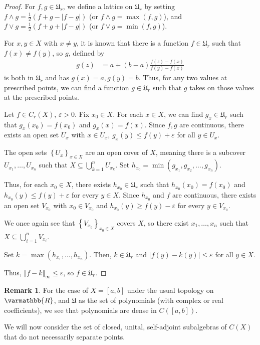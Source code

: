 \documentclass[10pt]{extarticle}
\newcommand{\R}{\mathbb{R}}
\newcommand{\norm}[1]{\left\Vert #1\right\Vert}
\newcommand{\set}[1]{\left\{#1\right\}}
\newcommand{\ve}{\varepsilon}
\theoremstyle{plain}
\theoremstyle{definition}
\theoremstyle{note}
\newtheorem*{remark}{Remark}
\renewcommand*{\mathbb}[1]{\varmathbb{#1}}
\renewcommand{\newline}{\hfill\break}
\begin{document}
\begin{proof}
  For $f,g\in \mathfrak{U}_r$, we define a lattice on $\mathfrak{U}_r$ by setting $f\wedge g = \frac{1}{2}\left(f + g - |f-g|\right)$ (or $f\wedge g = \max(f,g)$), and $f\vee g = \frac{1}{2}\left(f + g + |f-g|\right)$ (or $f\vee g = \min(f,g)$).\newline

  For $x,y\in X$ with $x\neq y$, it is known that there is a function $f\in \mathfrak{U}_r$ such that $f(x)\neq f(y)$, so $g$, defined by
  \begin{align*}
    g(z) &= a + \left(b-a\right)\frac{f(z)-f(x)}{f(y)-f(x)}
  \end{align*}
  is both in $\mathfrak{U}_r$ and has $g(x) = a,g(y) = b$. Thus, for any two values at prescribed points, we can find a function $g\in \mathfrak{U}_r$ such that $g$ takes on those values at the prescribed points.\newline

  Let $f\in C_{r}(X)$, $\ve > 0$. Fix $x_0\in X$. For each $x\in X$, we can find $g_x\in \mathfrak{U}_r$ such that $g_x\left(x_0\right) = f(x_0)$ and $g_x(x) = f(x)$. Since $f,g$ are continuous, there exists an open set $U_x$ with $x\in U_x$, $g_x(y)\leq f(y) + \ve$ for all $y\in U_{x}$.\newline

  The open sets $\set{U_x}_{x\in X}$ are an open cover of $X$, meaning there is a subcover $U_{x_1},\dots,U_{x_n}$ such that $X\subseteq \bigcup_{k=1}^{n}U_{x_k}$. Set $h_{x_0} = \min\left(g_{x_1},g_{x_2},\dots,g_{x_n}\right)$.\newline

  Thus, for each $x_0\in X$, there exists $h_{x_0}\in \mathfrak{U}_r$ such that $h_{x_0}\left(x_0\right) = f\left(x_0\right)$ and $h_{x_0}(y)\leq f(y) + \ve$ for every $y\in X$. Since $h_{x_0}$ and $f$ are continuous, there exists an open set $V_{x_0}$ with $x_0 \in V_{x_0}$ and $h_{x_0}(y) \geq f(y) - \ve$ for every $y\in V_{x_0}$.\newline

  We once again see that $\set{V_{x_0}}_{x_0\in X}$ covers $X$, so there exist $x_1,\dots,x_n$ such that $X\subseteq \bigcup_{i=1}^{n}V_{x_i}$.\newline

  Set $k = \max\left(h_{x_1},\dots,h_{x_n}\right)$. Then, $k\in \mathfrak{U}_r$ and $\left\vert f(y)-k(y) \right\vert\leq \ve$ for all $y\in X$.\newline

  Thus, $\norm{f-k}_{\infty}\leq \ve$, so $f\in \mathfrak{U}_r$.
\end{proof}
\begin{remark}
  For the case of $X = [a,b]$ under the usual topology on $\R$, and $\mathfrak{U}$ as the set of polynomials (with complex or real coefficients), we see that polynomials are dense in $C\left([a,b]\right)$.
\end{remark}
We will now consider the set of closed, unital, self-adjoint subalgebras of $C(X)$ that do not necessarily separate points.\newline
\end{document}
